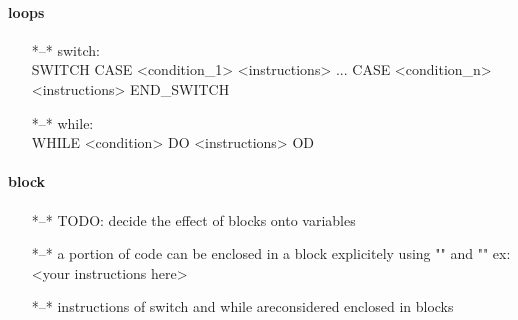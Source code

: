 \documentclass[10pt,a4paper,final]{report}
\begin{document}
\paragraph{loops}
\begin{itemize}
\item[*--*]switch:
	\\SWITCH
	CASE <condition_1>
		<instructions>
	...
	CASE <condition_n>
		<instructions>
	END_SWITCH
\item[*--*]while:
	\\WHILE <condition> DO
		<instructions>
	OD

\end{itemize}

\paragraph{block}
\begin{itemize}
\item[*--*]TODO: decide the effect of blocks onto variables
\item[*--*]a portion of code can be enclosed in a block explicitely using "{" and "}"
	ex: { <your instructions here> }
\item[*--*]instructions of switch and while areconsidered enclosed in blocks
\end{itemize}
\end{document}
